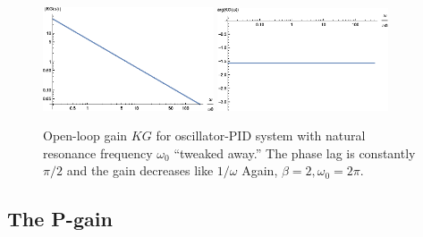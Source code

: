 \documentclass{article}
\theoremstyle{definition}
\begin{document}
\begin{figure}
	\centering
	\includegraphics[width=0.45\textwidth]{bode_3}
	\quad
	\includegraphics[width=0.45\textwidth]{bode_4}
	\caption{Open-loop gain $KG$ for oscillator-PID system with natural resonance frequency $\omega_0$ ``tweaked away.'' The phase lag is constantly $\pi/2$ and the gain decreases like $1/\omega$ Again, $\beta = 2,\omega_0 = 2\pi$.} %
	\label{fig:bode_2}
\end{figure}






\subsection{The P-gain}
\end{document}
